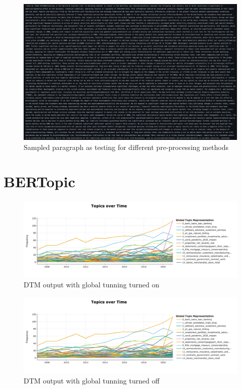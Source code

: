 \documentclass[12pt,MSc,a4paper,oneside]{muthesis}
\begin{document}
\label{appendix:8}
\begin{figure}[h]
    \centering
    \includegraphics[scale=0.10]{images/preprocessing-sample.png}
    \caption{Sampled paragraph as testing for different pre-processing methods}
\end{figure}

\chapter{BERTopic}

\label{appendix:9}
\begin{figure}[h]
    \centering
    \includegraphics[scale=0.35]{TOT_with_global.png}
    \caption{DTM output with global tunning turned on}
\end{figure}

\label{appendix:10}
\begin{figure}[h]
    \centering
    \includegraphics[scale=0.4]{TOT_without_global.png}
    \caption{DTM output with global tunning turned off}
\end{figure}
\end{document}
